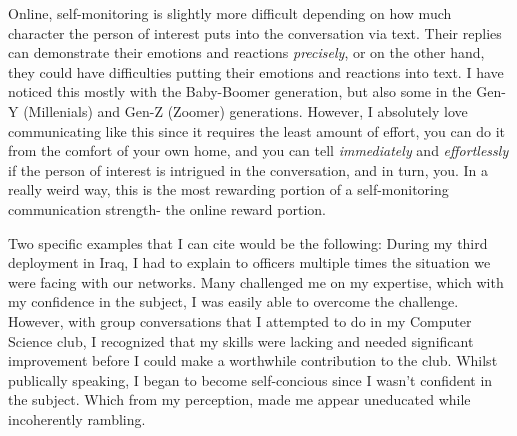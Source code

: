 \documentclass[12pt]{article}
\begin{document}
\par
Online, self-monitoring is slightly more difficult depending on how much character the person of interest puts into the conversation via text. Their replies can demonstrate their emotions and reactions \emph{precisely}, or on the other hand, they could have difficulties putting their emotions and reactions into text. I have noticed this mostly with the Baby-Boomer generation, but also some in the Gen-Y (Millenials) and Gen-Z (Zoomer) generations. However, I absolutely love communicating like this since it requires the least amount of effort, you can do it from the comfort of your own home, and you can tell \emph{immediately} and \emph{effortlessly} if the person of interest is intrigued in the conversation, and in turn, you. In a really weird way, this is the most rewarding portion of a self-monitoring communication strength- the online reward portion.
\par
Two specific examples that I can cite would be the following: During my third deployment in Iraq, I had to explain to officers multiple times the situation we were facing with our networks. Many challenged me on my expertise, which with my confidence in the subject, I was easily able to overcome the challenge. However, with group conversations that I attempted to do in my Computer Science club, I recognized that my skills were lacking and needed significant improvement before I could make a worthwhile contribution to the club. Whilst publically speaking, I began to become self-concious since I wasn't confident in the subject. Which from my perception, made me appear uneducated while incoherently rambling.
\end{document}

